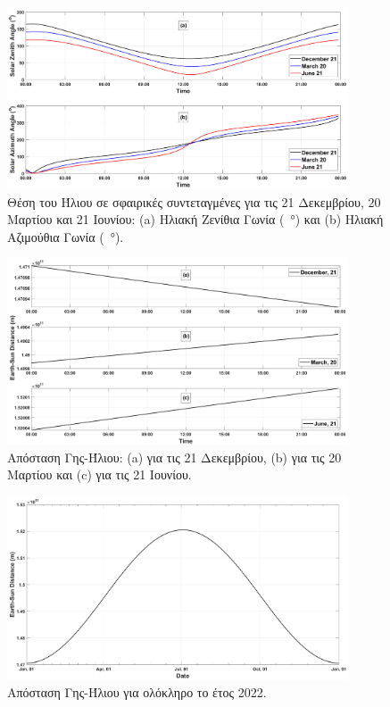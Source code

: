 \documentclass[12pt, a4paper]{report} %
\newcommand{\english}{\foreignlanguage{english}}
\begin{document}
\begin{figure}[ht]%
    \centering
    \includegraphics[width=0.9\textwidth]{Figures/SZA_SAA.jpg}
    \caption{Θέση του Ήλιου σε σφαιρικές συντεταγμένες για τις 21 Δεκεμβρίου, 20 Μαρτίου και 21 Ιουνίου: \english{(a)} Ηλιακή Ζενίθια Γωνία (\SI{}{\degree}) και \english{(b)} Ηλιακή Αζιμούθια Γωνία (\SI{}{\degree}).}
    \label{fig_SZA_SAA}
\end{figure}

\vspace{0.001cm}

\begin{figure}[ht]%
    \centering
    \includegraphics[width=0.9\textwidth]{Figures/diurnal_dist.jpg}
    \caption{Απόσταση Γης-Ήλιου: \english{(a)} για τις 21 Δεκεμβρίου, \english{(b)} για τις 20 Μαρτίου και \english{(c)} για τις 21 Ιουνίου.}
    \label{fig_diurnal_dist}
\end{figure}

\vspace{0.001cm}

\begin{figure}[ht]%
    \centering
    \includegraphics[width=0.9\textwidth]{Figures/annual_dist.jpg}
    \caption{Απόσταση Γης-Ήλιου για ολόκληρο το έτος 2022.}
    \label{fig_annual_dist}
\end{figure}

\clearpage%

\end{document}
